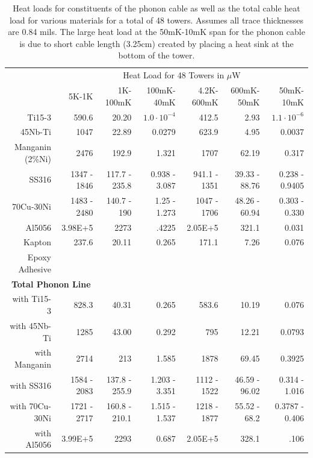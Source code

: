 \documentclass{report}
\begin{document}
\begin{table}[h]
\begin{threeparttable}
\begin{tabular}{rrrr|rrr}
\toprule
 & \multicolumn{6}{c}{Heat Load for 48 Towers in $\mu$W} \\
  & 5K-1K & 1K-100mK & 100mK-40mK & 4.2K-600mK & 600mK-50mK & 50mK-10mK \\
 \cmidrule(r){2-7}
   Ti15-3 \cite{wik} & 590.6 & 20.20 & $1.0\cdot10^{-4}$ & 412.5 & 2.93 & $1.1 \cdot 10^{-6}$ \\
   45Nb-Ti \cite{ols} & 1047 & 22.89 & 0.0279 & 623.9 & 4.95 & 0.0037 \\
   Manganin (2\%Ni) \cite{Peroni1999} & 2476 & 192.9 & 1.321 & 1707 & 62.19 & 0.317 \\
   SS316 \cite{lou} \cite{Barucci2008} & 1347 - 1846  & 117.7 - 235.8 & 0.938 - 3.087 & 941.1 - 1351 & 39.33 - 88.76 & 0.238 - 0.9405 \\
   70Cu-30Ni \cite{pob} \cite{ols} & 1483 - 2480 & 140.7 - 190 & 1.25 - 1.273 & 1047 - 1706 & 48.26 - 60.94 & 0.303 - 0.330 \\
   Al5056 \cite{Coccia1983} & 3.98E+5 & 2273 & .4225 & 2.05E+5 & 321.1 & 0.031 \\
   Kapton \cite{bar} & 237.6 & 20.11 & 0.265 & 171.1 & 7.26 & 0.076 \\
   Epoxy Adhesive &&&&&& \\
   \multicolumn{2}{c}{\bf{Total Phonon Line}} & & & & & \\
   with Ti15-3 & 828.3 & 40.31 & 0.265 & 583.6 & 10.19 & 0.076 \\
   with 45Nb-Ti & 1285 & 43.00 & 0.292 & 795 & 12.21 & 0.0793 \\
   with Manganin & 2714 & 213 & 1.585 & 1878 & 69.45 & 0.3925 \\
   with SS316 & 1584 - 2083 & 137.8 - 255.9 & 1.203 - 3.351 & 1112 - 1522 & 46.59 - 96.02 & 0.314 - 1.016 \\
   with 70Cu-30Ni & 1721 - 2717 & 160.8 - 210.1 & 1.515 - 1.537 & 1218 - 1877 & 55.52 - 68.2 & 0.3787 - 0.406 \\
   with Al5056 & 3.99E+5 & 2293 & 0.687 & 2.05E+5 & 328.1 & .106 \\
  \bottomrule
\end{tabular}
\end{threeparttable}
\caption{Heat loads for constituents of the phonon cable as well as the total cable heat load for various materials for a total of 48 towers. Assumes all trace thicknesses are 0.84 mils. The large heat load at the 50mK-10mK span for the phonon cable is due to short cable length (3.25cm) created by placing a heat sink at the bottom of the tower.}
\end{table}
\end{document}
